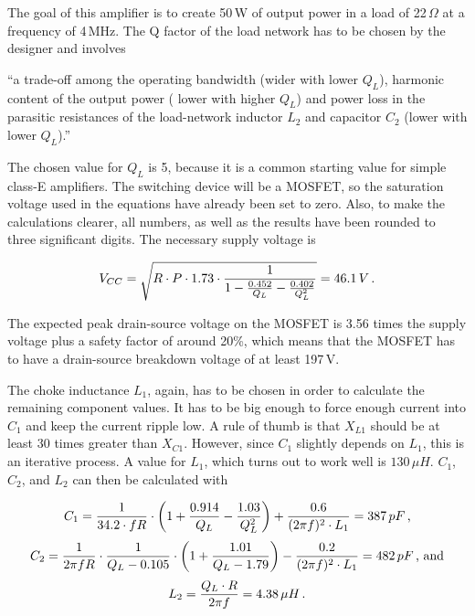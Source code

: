 The goal of this amplifier is to create 50\,W of output power in a load of 22\,\(\Omega\) at a frequency of 4\,MHz. The Q factor of the load network has to be chosen by the designer and involves 

\begin{displayquote}
\enquote{a trade-off among the operating bandwidth (wider with lower \(Q_L\)), harmonic content of the output power (\textelp{} lower with higher \(Q_L\)) and power loss in the parasitic resistances of the load-network inductor \(L_2\) and capacitor \(C_2\) (lower with lower \(Q_L\)).}
\end{displayquote}

The chosen value for \(Q_L\) is 5, because it is a common starting value for simple class-E amplifiers. The switching device will be a MOSFET, so the saturation voltage used in the equations have already been set to zero. Also, to make the calculations clearer, all numbers, as well as the results have been rounded to three significant digits. The necessary supply voltage is

\begin{equation*}
    V_{CC} = \sqrt{R \cdot P \cdot 1.73 \cdot \frac{1}{1 - \frac{0.452}{Q_L} - \frac{0.402}{Q_L^2}}} = 46.1\,V\textnormal{\,.}
\end{equation*}

The expected peak drain-source voltage on the MOSFET is 3.56 times the supply voltage plus a safety factor of around 20\%, which means that the MOSFET has to have a drain-source breakdown voltage of at least 197\,V. 

The choke inductance \(L_1\), again, has to be chosen in order to calculate the remaining component values. It has to be big enough to force enough current into \(C_1\) and keep the current ripple low. A rule of thumb is that \(X_{L1}\) should be at least 30 times greater than \(X_{C1}\). However, since \(C_1\) slightly depends on \(L_1\), this is an iterative process. A value for \(L_1\), which turns out to work well is \(130\,\mu H\). \(C_1\), \(C_2\), and \(L_2\) can then be calculated with

\begin{equation*}
    C_1 = \frac{1}{34.2\cdot f R} \cdot \left( 1 + \frac{0.914}{Q_L} - \frac{1.03}{Q_L^2} \right) + \frac{0.6}{(2 \pi f)^2  \cdot L_1} = 387\,pF\textnormal{\,,}
\end{equation*}
\begin{equation*}
    C_2 = \frac{1}{2 \pi  f  R} \cdot \frac{1}{Q_L - 0.105} \cdot \left( 1 + \frac{1.01}{Q_L - 1.79} \right) - \frac{0.2}{(2 \pi f)^2 \cdot L_1} = 482\,pF \textnormal{\,, and}
\end{equation*}
\begin{equation*}
    L_2 = \frac{Q_L \cdot R}{2 \pi f} = 4.38\,\mu H\textnormal{\,.}
\end{equation*}
 
